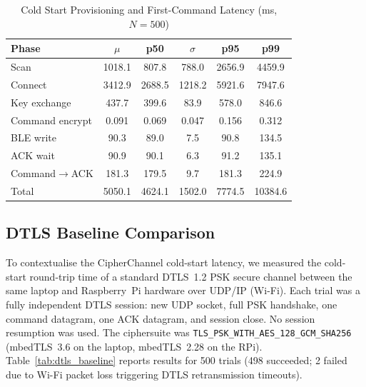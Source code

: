 \documentclass[journal]{IEEEtran}
\begin{document}
\begin{table}[!t]
\renewcommand{\arraystretch}{1.15}
\setlength{\tabcolsep}{3pt}
\caption{Cold Start Provisioning and First-Command Latency (ms, $N=500$)}
\label{tab:coldstart}
\centering
\scriptsize
\begin{tabular}{lccccc}
\toprule
\textbf{Phase} & $\mu$ & \textbf{p50} & $\sigma$ & \textbf{p95} & \textbf{p99} \\
\midrule
Scan & 1018.1 & 807.8 & 788.0 & 2656.9 & 4459.9 \\
Connect & 3412.9 & 2688.5 & 1218.2 & 5921.6 & 7947.6 \\
Key exchange & 437.7 & 399.6 & 83.9 & 578.0 & 846.6 \\
Command encrypt & 0.091 & 0.069 & 0.047 & 0.156 & 0.312 \\
BLE write & 90.3 & 89.0 & 7.5 & 90.8 & 134.5 \\
ACK wait & 90.9 & 90.1 & 6.3 & 91.2 & 135.1 \\
Command$\rightarrow$ACK & 181.3 & 179.5 & 9.7 & 181.3 & 224.9 \\
Total & 5050.1 & 4624.1 & 1502.0 & 7774.5 & 10384.6 \\
\bottomrule
\end{tabular}
\end{table}

\subsection{DTLS Baseline Comparison}
\label{sec:dtls-baseline}

To contextualise the CipherChannel cold-start latency, we measured the cold-start round-trip time of a standard DTLS~1.2 PSK secure channel between the same laptop and Raspberry~Pi hardware over UDP/IP (Wi-Fi). Each trial was a fully independent DTLS session: new UDP socket, full PSK handshake, one command datagram, one ACK datagram, and session close. No session resumption was used. The ciphersuite was \texttt{TLS\_PSK\_WITH\_AES\_128\_GCM\_SHA256} (mbedTLS~3.6 on the laptop, mbedTLS~2.28 on the RPi). Table~\ref{tab:dtls_baseline} reports results for 500 trials (498 succeeded; 2 failed due to Wi-Fi packet loss triggering DTLS retransmission timeouts).
\end{document}
